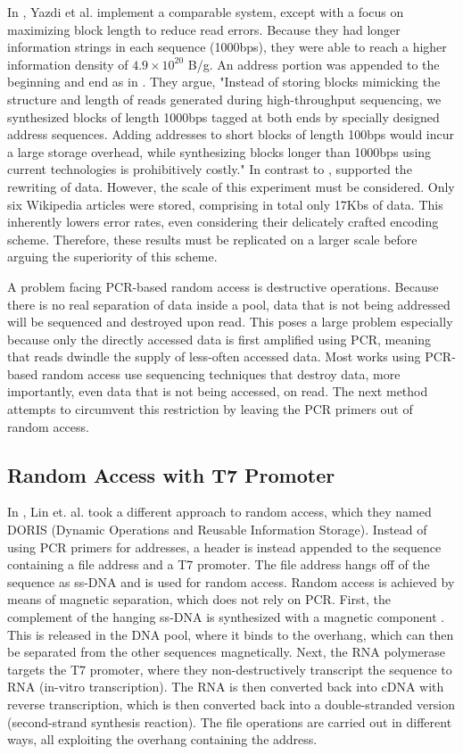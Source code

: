 \documentclass[a4paper,conference]{IEEEtran}
\begin{document}
In \cite{}, Yazdi et al. implement a comparable system, except with a focus on maximizing block length to reduce read errors. Because they had longer information strings in each sequence (1000bps), they were able to reach a higher information density of $4.9 \times 10^{20}$ B/g. An address portion was appended to the beginning and end as in \cite{}. They argue, "Instead of storing blocks mimicking the structure and length of reads generated during high-throughput sequencing, we synthesized blocks of length 1000bps tagged at both ends by specially designed address sequences. Adding addresses to short blocks of length 100bps would incur a large storage overhead, while synthesizing blocks longer than 1000bps using current technologies is prohibitively costly." In contrast to \cite{}, \cite{} supported the rewriting of data. However, the scale of this experiment must be considered. Only six Wikipedia articles were stored, comprising in total only 17Kbs of data. This inherently lowers error rates, even considering their delicately crafted encoding scheme. Therefore, these results must be replicated on a larger scale before arguing the superiority of this scheme. 

A problem facing PCR-based random access is destructive operations. Because there is no real separation of data inside a pool, data that is not being addressed will be sequenced and destroyed upon read. This poses a large problem especially because only the directly accessed data is first amplified using PCR, meaning that reads dwindle the supply of less-often accessed data. Most works using PCR-based random access use sequencing techniques that destroy data, more importantly, even data that is not being accessed, on read. The next method attempts to circumvent this restriction by leaving the PCR primers out of random access.

\subsection{Random Access with T7 Promoter}
In \cite{}, Lin et. al. took a different approach to random access, which they named DORIS (Dynamic Operations and Reusable Information Storage). Instead of using PCR primers for addresses, a header is instead appended to the sequence containing a file address and a T7 promoter. The file address hangs off of the sequence as ss-DNA and is used for random access. Random access is achieved by means of magnetic separation, which does not rely on PCR. First, the complement of the hanging ss-DNA is synthesized with a magnetic component \cite{}. This is released in the DNA pool, where it binds to the overhang, which can then be separated from the other sequences magnetically. Next, the RNA polymerase targets the T7 promoter, where they non-destructively transcript the sequence to RNA (in-vitro transcription). The RNA is then converted back into cDNA with reverse transcription, which is then converted back into a double-stranded version (second-strand synthesis reaction). The file operations are carried out in different ways, all exploiting the overhang containing the address.
\end{document}
